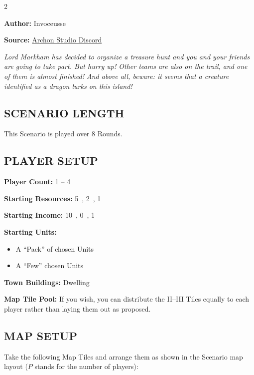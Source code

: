 
\begin{multicols}{2}

\textbf{Author:} Invoceusse

\textbf{Source:} \href{https://discord.com/channels/740870068178649108/1222679455261261986}{Archon Studio Discord}

\textit{Lord Markham has decided to organize a treasure hunt and you and your friends are going to take part.
  But hurry up! Other teams are also on the trail, and one of them is almost finished!
  And above all, beware: it seems that a creature identified as a dragon lurks on this island!}
\subsection*{\MakeUppercase{Scenario Length}}

This Scenario is played over 8 Rounds.

\subsection*{\MakeUppercase{Player Setup}}

\textbf{Player Count:} 1 -- 4

\textbf{Starting Resources:} 5~, 2~, 1~

\textbf{Starting Income:} 10~, 0~, 1~

\textbf{Starting Units:}
\begin{itemize}
  \item A ``Pack'' of chosen  Units
  \item A ``Few'' chosen  Units
\end{itemize}

\textbf{Town Buildings:}  Dwelling

\textbf{Map Tile Pool:} If you wish, you can distribute the II--III Tiles equally to each player rather than laying them out as proposed.

\subsection*{\MakeUppercase{Map Setup}}

Take the following Map Tiles and arrange them as shown in the Scenario map layout ($P$ stands for the number of players):


\end{multicols}
